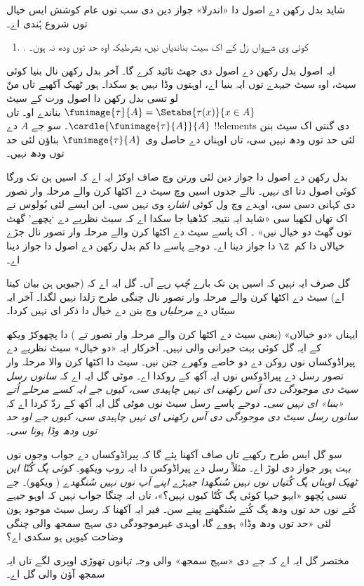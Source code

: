 \documentclass[../../../include/open-logic-section]{subfiles}
\begin{document}

شاید بدل رکھن دے اصول دا «اندرلا» جواز دین دی سب توں عام کوشش ایس خیال توں شروع ہُندی اے۔
\begin{enumerate}
	\item[] \limofsize. کوئی وی شےواں رَل کے اک سیٹ بناندیاں نیں، بشرطیکہ اوہ حد توں ودھ نہ ہون۔
\end{enumerate}
ایہ اصول بدل رکھن دے اصول دی جھٹ تائید کرے گا۔ آخر بدل رکھن نال بنیا کوئی سیٹ، اوہ سیٹ جیہدے توں ایہ بنیا اے، اوہتوں وڈا نہیں ہو سکدا۔ ہور ٹھیک آکھیے تاں منّ لو تسی بدل رکھن دا اصول ورت کے سیٹ
$\funimage{\tau}{A} = \Setabs{\tau(x)}{x \in A}$ بناندے او۔
تاں $\cardle{\funimage{\tau}{A}}{A}$۔ سو جے $A$ دے !!{element}s دی گنتی اک سیٹ بنن لئی حد توں ودھ نہیں سی، تاں اوہناں دے حاصل وی $\funimage{\tau}{A}$ بناؤن لئی حد توں ودھ نہیں۔

بدل رکھن دے اصول دا جواز دین لئی \limofsize{} ورتن وچ صاف اوکڑ ایہ اے کہ اسیں ہن تک \limofsize ورگا کوئی اصول دتا ای \emph{نہیں}۔ نالے جدوں اسیں  وچ سیٹ دے اکٹھا کرن والے مرحلہ وار تصور دی کہانی دسی سی، اوہدے وچ \limofsize ول کوئی \emph{اشارہ} وی نہیں سی۔ این ایسے لئی بُولوس نے اک تھاں لکھیا سی «شاید ایہ نتیجہ کڈھیا جا سکدا اے کہ سیٹ نظریے دے ‘پچھے’ گھٹ توں گھٹ دو خیال نیں» \citeyearpar[p.~19]{Boolos1989}۔ اک پاسے سیٹ دے اکٹھا کرن والے مرحلہ وار تصور نال جڑے خیالاں دا کم~$\Z$ دا جواز دینا اے۔ دوجے پاسے \limofsize{} دا کم بدل رکھن دے اصول دا جواز دینا اے۔

گل صرف ایہ نہیں کہ اسیں ہن تک \limofsize بارے \emph{چُپ} رہے آں۔ گل ایہ اے کہ \limofsize{} (جیویں ہن بیان کیتا اے) سیٹ دے اکٹھا کرن والے مرحلہ وار تصور نال چنگی طرح رَلدا نہیں لگدا۔ آخر ایہ سیٹاں دے \emph{مرحلیاں} وچ بنن دے خیال دا ذکر ای نہیں کردا۔

ایہناں «دو خیالاں» (یعنی سیٹ دے اکٹھا کرن والے مرحلہ وار تصور تے \limofsize) دا پچھوکڑ ویکھ کے ایہ گل کوئی بہت حیرانی والی نہیں۔ آخرکار ایہ «دو خیال» سیٹ نظریے دے پیراڈوکساں نوں روکن دے دو خاصے وکھرے جتن نیں۔ سیٹ دا اکٹھا کرن والا مرحلہ وار تصور رسل دے پیراڈوکس نوں ایہ آکھ کے روکدا اے۔ موٹی گل ایہ اے کہ \emph{سانوں رسل سیٹ دی موجودگی دی آس رکھنی ای نہیں چاہیدی سی، کیوں جے ایہ کسے مرحلے اُتے «بننا» ای نہیں سی}۔ دوجے پاسے \limofsize{} رسل سیٹ نوں موٹی گل ایہ آکھ کے ردّ کردا اے کہ \emph{سانوں رسل سیٹ دی موجودگی دی آس رکھنی ای نہیں چاہیدی سی، کیوں جے اوہ حد توں ودھ وڈا ہونا سی}۔

سو گل ایس طرح رکھیے تاں صاف آکھنا پئے گا کہ پیراڈوکساں دے جواب وجوں \limofsize{} نوں \emph{بہت} ہور جواز دی لوڑ اے۔ مثلاً رسل دے پیراڈوکس دا ایہ روپ ویکھو۔ \emph{کوئی پگ کُتّا این ٹھیک اوہناں پگ کُتیاں نوں نہیں سُنگھدا جیہڑے اپنے آپ نوں نہیں سُنگھدے} ( ویکھو)۔ جے تسی پُچھو «ایہو جیہا کوئی پگ کُتّا کیوں نہیں؟»، تاں ایہ چنگا جواب نہیں کہ اوہو جیہے کُتے نوں حد توں ودھ پگ کُتے سُنگھنے پینے سن۔ فیر ایہ آکھنا کہ رسل سیٹ موجود ہون لئی «حد توں ودھ وڈا» ہووے گا، اوہدی غیرموجودگی دی سہج سمجھ والی چنگی وضاحت کیویں ہو سکدی اے؟

مختصر گل ایہ اے کہ جے \limofsize دی «سہج سمجھ» والی وجہ تہانوں تھوڑی اوپری لگے تاں ایہ سمجھ آؤن والی گل اے۔
\end{document}
